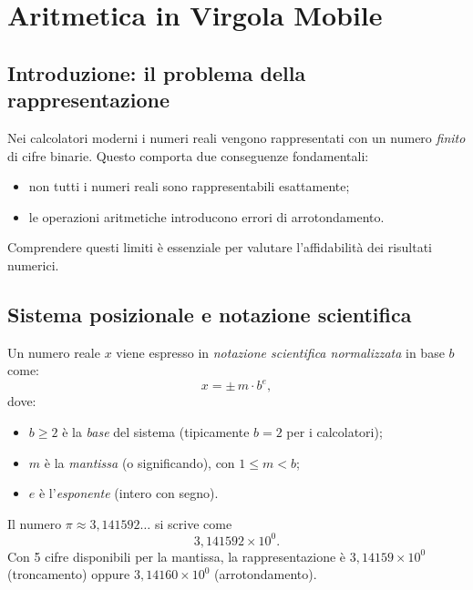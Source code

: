 \chapter{Aritmetica in Virgola Mobile}
\label{ch:fp}

\section{Introduzione: il problema della rappresentazione}

Nei calcolatori moderni i numeri reali vengono rappresentati con un numero
\emph{finito} di cifre binarie. Questo comporta due conseguenze fondamentali:
\begin{itemize}
  \item non tutti i numeri reali sono rappresentabili esattamente;
  \item le operazioni aritmetiche introducono errori di arrotondamento.
\end{itemize}

Comprendere questi limiti è essenziale per valutare l'affidabilità dei risultati
numerici.

\section{Sistema posizionale e notazione scientifica}

Un numero reale $x$ viene espresso in \emph{notazione scientifica normalizzata} in
base $b$ come:
\begin{equation}
  x = \pm\, m \cdot b^e,
  \label{eq:scientific}
\end{equation}
dove:
\begin{itemize}
  \item $b \geq 2$ è la \emph{base} del sistema (tipicamente $b = 2$ per i calcolatori);
  \item $m$ è la \emph{mantissa} (o significando), con $1 \leq m < b$;
  \item $e$ è l'\emph{esponente} (intero con segno).
\end{itemize}

\begin{example}
Il numero $\pi \approx 3{,}141592\ldots$ si scrive come
\[
  3{,}141592 \times 10^{0}.
\]
Con 5 cifre disponibili per la mantissa, la rappresentazione è
$3{,}14159 \times 10^{0}$ (troncamento) oppure $3{,}14160 \times 10^{0}$ (arrotondamento).
\end{example}

